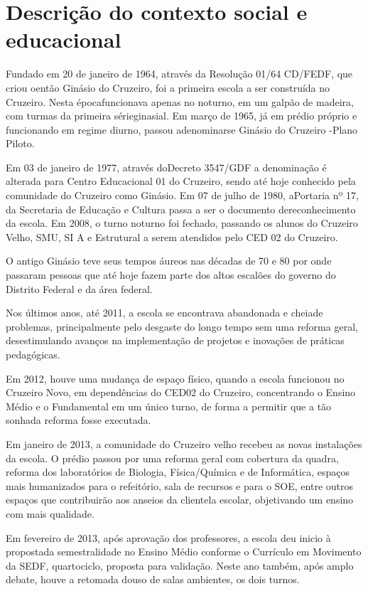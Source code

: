 \chapter{Descrição do contexto social e educacional}

Fundado em 20 de janeiro de 1964, através da Resolução 01/64 CD/FEDF, que criou oentão Ginásio do Cruzeiro, foi a primeira escola a ser construída no Cruzeiro. Nesta épocafuncionava apenas no noturno, em um galpão de madeira, com turmas da primeira sérieginasial. Em março de 1965, já em prédio próprio e funcionando em regime diurno, passou adenominarse Ginásio do Cruzeiro -Plano Piloto. 

Em 03 de janeiro de 1977, através doDecreto 3547/GDF a denominação é alterada para Centro Educacional 01 do Cruzeiro, sendo até hoje conhecido pela comunidade do Cruzeiro como Ginásio. Em 07 de julho de 1980, aPortaria nº 17, da Secretaria de Educação e Cultura passa a ser o documento dereconhecimento da escola.
Em 2008, o turno noturno foi fechado, passando os alunos do Cruzeiro Velho, SMU, SI A e Estrutural a serem atendidos pelo CED 02 do Cruzeiro.

O antigo Ginásio teve seus tempos áureos nas décadas de 70 e 80 por onde passaram pessoas que até hoje fazem parte dos altos escalões do governo do Distrito Federal e da área federal.

Nos últimos anos, até 2011, a escola se encontrava abandonada e cheiade problemas, principalmente pelo desgaste do longo tempo sem uma reforma geral, desestimulando avanços na implementação de projetos e inovações de práticas pedagógicas.

Em 2012, houve uma mudança de espaço físico, quando a escola funcionou no Cruzeiro Novo, em dependências do CED02 do Cruzeiro, concentrando o Ensino Médio e o Fundamental em um único turno, de forma a permitir que a tão sonhada reforma fosse executada.

Em janeiro de 2013, a comunidade do Cruzeiro velho recebeu as novas instalações da escola. O prédio passou por uma reforma geral com cobertura da quadra, reforma dos laboratórios de Biologia, Física/Química e de Informática, espaços mais humanizados para o refeitório, sala de recursos e para o SOE, entre outros espaços que contribuirão aos anseios da clientela escolar, objetivando um ensino com mais qualidade.


Em fevereiro de 2013, após aprovação dos professores, a escola deu inicio à propostada semestralidade no Ensino Médio conforme o Currículo em Movimento da SEDF, quartociclo, proposta para validação. Neste ano também, após amplo debate, houve a retomada douso de salas ambientes, os dois turnos.

